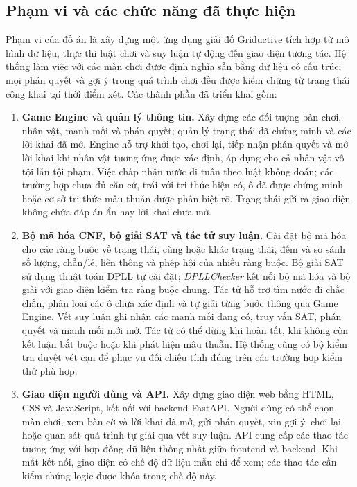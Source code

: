 \subsection{Phạm vi và các chức năng đã thực hiện}
\label{subsec:project_scope}

Phạm vi của đồ án là xây dựng một ứng dụng giải đố Griductive tích hợp từ mô hình dữ liệu, thực thi luật chơi và suy luận tự động đến giao diện tương tác. Hệ thống làm việc với các màn chơi được định nghĩa sẵn bằng dữ liệu có cấu trúc; mọi phán quyết và gợi ý trong quá trình chơi đều được kiểm chứng từ trạng thái công khai tại thời điểm xét. Các thành phần đã triển khai gồm:

\begin{enumerate}
    \item \textbf{Game Engine và quản lý thông tin.}
    Xây dựng các đối tượng bàn chơi, nhân vật, manh mối và phán quyết; quản lý trạng thái đã chứng minh và các lời khai đã mở. Engine hỗ trợ khởi tạo, chơi lại, tiếp nhận phán quyết và mở lời khai khi nhân vật tương ứng được xác định, áp dụng cho cả nhân vật vô tội lẫn tội phạm. Việc chấp nhận nước đi tuân theo luật không đoán; các trường hợp chưa đủ căn cứ, trái với tri thức hiện có, ô đã được chứng minh hoặc cơ sở tri thức mâu thuẫn được phân biệt rõ. Trạng thái gửi ra giao diện không chứa đáp án ẩn hay lời khai chưa mở.

    \item \textbf{Bộ mã hóa CNF, bộ giải SAT và tác tử suy luận.}
    Cài đặt bộ mã hóa cho các ràng buộc về trạng thái, cùng hoặc khác trạng thái, đếm và so sánh số lượng, chẵn/lẻ, liên thông và phép hội của nhiều ràng buộc. Bộ giải SAT sử dụng thuật toán DPLL tự cài đặt; \textit{DPLLChecker} kết nối bộ mã hóa và bộ giải với giao diện kiểm tra ràng buộc chung. Tác tử hỗ trợ tìm nước đi chắc chắn, phân loại các ô chưa xác định và tự giải từng bước thông qua Game Engine. Vết suy luận ghi nhận các manh mối đang có, truy vấn SAT, phán quyết và manh mối mới mở. Tác tử có thể dừng khi hoàn tất, khi không còn kết luận bắt buộc hoặc khi phát hiện mâu thuẫn. Hệ thống cũng có bộ kiểm tra duyệt vét cạn để phục vụ đối chiếu tính đúng trên các trường hợp kiểm thử phù hợp.

    \item \textbf{Giao diện người dùng và API.}
    Xây dựng giao diện web bằng HTML, CSS và JavaScript, kết nối với backend FastAPI. Người dùng có thể chọn màn chơi, xem bàn cờ và lời khai đã mở, gửi phán quyết, xin gợi ý, chơi lại hoặc quan sát quá trình tự giải qua vết suy luận. API cung cấp các thao tác tương ứng với hợp đồng dữ liệu thống nhất giữa frontend và backend. Khi mất kết nối, giao diện có chế độ dữ liệu mẫu chỉ để xem; các thao tác cần kiểm chứng logic được khóa trong chế độ này.


\end{enumerate}
